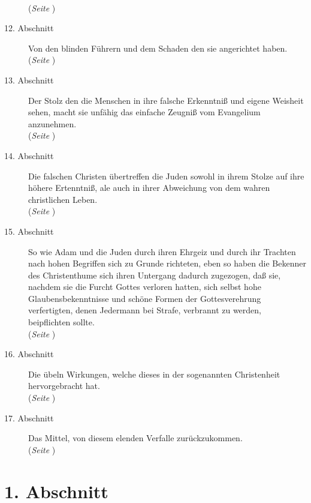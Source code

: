 \begin{description}
\\(\textit{Seite \pageref{kap7_ab11}})
\item[12. Abschnitt] Von den blinden Führern und dem Schaden den sie angerichtet
haben.
\\(\textit{Seite \pageref{kap7_ab12}})
\item[13. Abschnitt] Der Stolz den die Menschen in ihre falsche Erkenntniß und
eigene Weisheit sehen, macht sie unfähig das einfache Zeugniß vom Evangelium
anzunehmen.
\\(\textit{Seite \pageref{kap7_ab13}})
\item[14. Abschnitt] Die falschen Christen übertreffen die Juden sowohl in ihrem
Stolze auf ihre höhere Ertenntniß, ale auch in ihrer Abweichung von dem wahren
christlichen Leben.
\\(\textit{Seite \pageref{kap7_ab14}})
\item[15. Abschnitt] So wie Adam und die Juden durch ihren Ehrgeiz und durch ihr
Trachten nach hohen Begriffen sich zu Grunde richteten, eben so haben die
Bekenner des Christenthume sich ihren Untergang dadurch zugezogen, daß sie,
nachdem sie die Furcht Gottes verloren hatten, sich selbst hohe
Glaubensbekenntnisse und schöne Formen der Gottesverehrung verfertigten, denen
Jedermann bei Strafe, verbrannt zu werden, beipflichten sollte.
\\(\textit{Seite \pageref{kap7_ab15}})
\item[16. Abschnitt] Die übeln Wirkungen, welche dieses in der sogenannten
Christenheit hervorgebracht hat.
\\(\textit{Seite \pageref{kap7_ab16}})
\item[17. Abschnitt] Das Mittel, von diesem elenden Verfalle zurückzukommen.
\\(\textit{Seite \pageref{kap7_ab17}})

\end{description}
\normalsize


\section{1. Abschnitt} \label{kap7_ab1}

